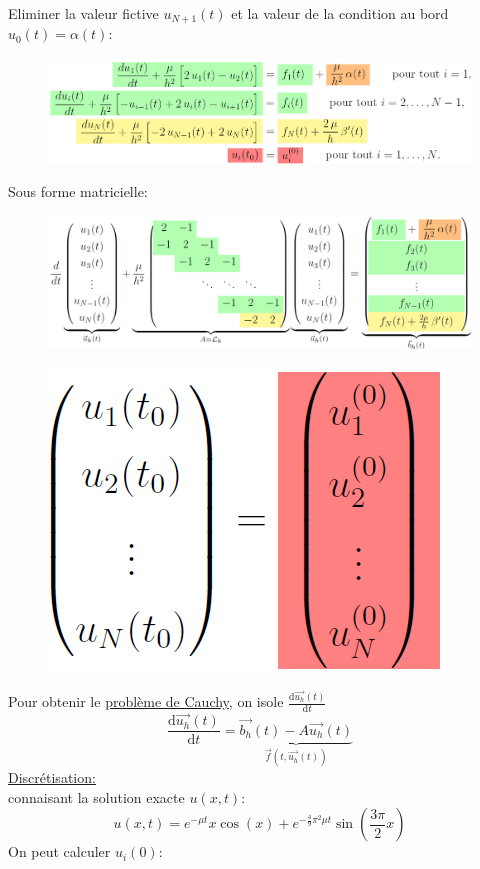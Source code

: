 Eliminer la valeur fictive $u_{N+1}(t)$ et la valeur de la condition au bord
$u_0(t)=\alpha(t)$:
\begin{figure}[H]
    \centering
    \includegraphics[width=\columnwidth]{images/semaine12_exemple_evolutif3.png}
\end{figure}
Sous forme matricielle:
\begin{figure}[H]
    \centering
    \includegraphics[width=\columnwidth]{images/semaine12_exemple_evolutif4.png}
\end{figure}
\begin{figure}[H]
    \centering
    \includegraphics[width=0.3\columnwidth]{images/semaine12_exemple_evolutif5.png}
\end{figure}
Pour obtenir le \underline{problème de Cauchy}, on isole $\frac{\mathrm{d}\overrightarrow{u_h}(t)}{\mathrm{d}t}$
\begin{equation*}
    \boxed{\frac{\mathrm{d}\overrightarrow{u_h}(t)}{\mathrm{d}t}=\underbrace{\overrightarrow{b_h}(t)-A\overrightarrow{u_h}(t)}_{\overrightarrow{f}(t,\overrightarrow{u_h}(t))}}
\end{equation*}
\underline{Discrétisation:}\\
connaisant la solution exacte $u(x,t)$:
\begin{equation*}
    u(x,t)=e^{-\mu t}x\cos(x)+e^{-\frac{4}{9}\pi^2\mu t}\sin(\frac{3\pi}{2}x)
\end{equation*}
On peut calculer $u_i(0)$:
